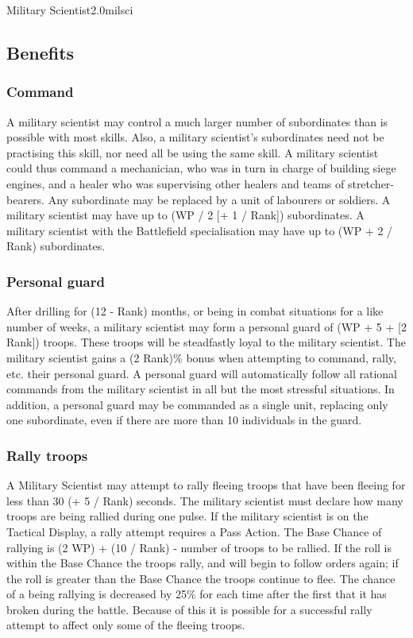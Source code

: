 \begin{skill}{Military Scientist}{2.0}{milsci}
\begin{Description}
\end{Description}

\subsection{Benefits}

\subsubsection{Command}

A military scientist may control a much larger number of subordinates
than is possible with most skills. Also, a military scientist's
subordinates need not be practising this skill, nor need all be using
the same skill. A military scientist could thus command a mechanician,
who was in turn in charge of building siege engines, and a healer who
was supervising other healers and teams of stretcher-bearers.  Any
subordinate may be replaced by a unit of labourers or soldiers. A
military scientist may have up to (WP / 2 [+ 1 / Rank]) subordinates.
A military scientist with the Battlefield specialisation may have up
to (WP + 2 / Rank) subordinates.

\subsubsection{Personal guard}

After drilling for (12 - Rank) months, or being in combat situations
for a like number of weeks, a military scientist may form a personal
guard of (WP + 5 + [2 \x Rank]) troops.  These troops will be
steadfastly loyal to the military scientist.  The military scientist
gains a (2 \x Rank)\% bonus when attempting to command, rally, etc.
their personal guard.  A personal guard will automatically follow all
rational commands from the military scientist in all but the most
stressful situations. In addition, a personal guard may be commanded
as a single unit, replacing only one subordinate, even if there are
more than 10 individuals in the guard.

\subsubsection{Rally troops}

A Military Scientist may attempt to rally fleeing troops that have
been fleeing for less than 30 (+ 5 / Rank) seconds.  The military
scientist must declare how many troops are being rallied during one
pulse.  If the military scientist is on the Tactical Display, a rally
attempt requires a Pass Action.  The Base Chance of rallying is (2 \x
WP) + (10 / Rank) - number of troops to be rallied. If the roll is
within the Base Chance the troops rally, and will begin to follow
orders again; if the roll is greater than the Base Chance the troops
continue to flee.  The chance of a being rallying is decreased by 25\%
for each time after the first that it has broken during the battle.
Because of this it is possible for a successful rally attempt to
affect only some of the fleeing troops.


\end{skill}
